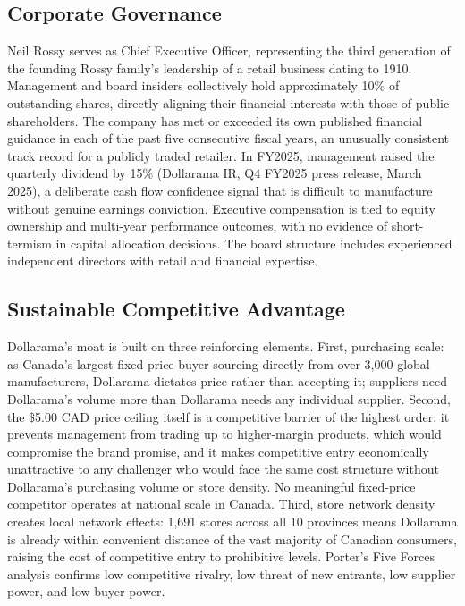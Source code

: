 \documentclass[11pt]{article}
\begin{document}
\subsection{Corporate Governance}
Neil Rossy serves as Chief Executive Officer, representing the third generation of the founding Rossy family's leadership of a retail business dating to 1910. Management and board insiders collectively hold approximately 10\% of outstanding shares, directly aligning their financial interests with those of public shareholders. The company has met or exceeded its own published financial guidance in each of the past five consecutive fiscal years, an unusually consistent track record for a publicly traded retailer. In FY2025, management raised the quarterly dividend by 15\% (Dollarama IR, Q4 FY2025 press release, March 2025), a deliberate cash flow confidence signal that is difficult to manufacture without genuine earnings conviction. Executive compensation is tied to equity ownership and multi-year performance outcomes, with no evidence of short-termism in capital allocation decisions. The board structure includes experienced independent directors with retail and financial expertise.

\subsection{Sustainable Competitive Advantage}
Dollarama's moat is built on three reinforcing elements. First, purchasing scale: as Canada's largest fixed-price buyer sourcing directly from over 3,000 global manufacturers, Dollarama dictates price rather than accepting it; suppliers need Dollarama's volume more than Dollarama needs any individual supplier. Second, the \$5.00 CAD price ceiling itself is a competitive barrier of the highest order: it prevents management from trading up to higher-margin products, which would compromise the brand promise, and it makes competitive entry economically unattractive to any challenger who would face the same cost structure without Dollarama's purchasing volume or store density. No meaningful fixed-price competitor operates at national scale in Canada. Third, store network density creates local network effects: 1,691 stores across all 10 provinces means Dollarama is already within convenient distance of the vast majority of Canadian consumers, raising the cost of competitive entry to prohibitive levels. Porter's Five Forces analysis confirms low competitive rivalry, low threat of new entrants, low supplier power, and low buyer power.
\end{document}
